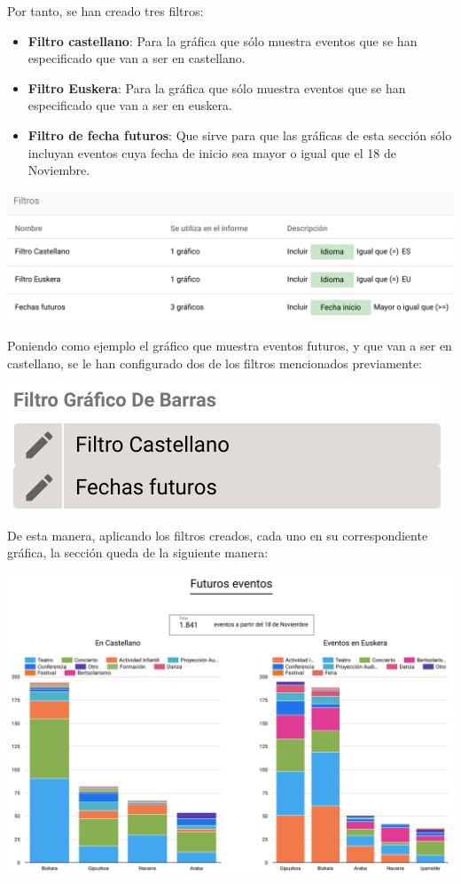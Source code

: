 \documentclass{\ClassPath/viu-tfm-template}
\begin{document}
Por tanto, se han creado tres filtros:
\begin{itemize}
    \item \textbf{Filtro castellano}: Para la gráfica que sólo muestra eventos que se han especificado que van a ser en castellano.
    \item \textbf{Filtro Euskera}: Para la gráfica que sólo muestra eventos que se han especificado que van a ser en euskera.
    \item \textbf{Filtro de fecha futuros}: Que sirve para que las gráficas de esta sección sólo incluyan eventos cuya fecha de inicio sea mayor o igual que el 18 de Noviembre.
\end{itemize}

\begin{center}
    \includegraphics[frame,width=0.9\linewidth]{img/filtros_todos.png}
\end{center}


Poniendo como ejemplo el gráfico que muestra eventos futuros, y que van a ser en castellano, se le han configurado dos de los filtros mencionados previamente:

\begin{center}
    \includegraphics[frame,width=0.45\linewidth]{img/filtros.png}
\end{center}


De esta manera, aplicando los filtros creados, cada uno en su correspondiente gráfica, la sección queda de la siguiente manera:

\begin{center}
    \includegraphics[frame,width=0.9\linewidth]{img/futuro2.png}
\end{center}
\end{document}
